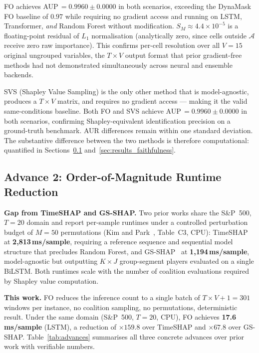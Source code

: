 \documentclass[runningheads]{llncs}
\begin{document}
FO achieves AUP\,$=0.9960\pm0.0000$ in both scenarios, exceeding the
DynaMask FO baseline of $0.97$ while requiring no gradient access and
running on LSTM, Transformer, \emph{and} Random Forest without
modification. $S_M \approx 4.4{\times}10^{-5}$ is a floating-point
residual of $L_1$ normalisation (analytically zero, since cells
outside $\mathcal{A}$ receive zero raw importance). This confirms
per-cell resolution over all $V{=}15$ original ungrouped variables,
the $T{\times}V$ output format that prior gradient-free methods had
not demonstrated simultaneously across neural and ensemble backends.

SVS (Shapley Value Sampling) is the only other method that is
model-agnostic, produces a $T{\times}V$ matrix, and requires no
gradient access --- making it the valid same-conditions baseline.
Both FO and SVS achieve AUP\,$=0.9960\pm0.0000$ in both scenarios,
confirming Shapley-equivalent identification precision on a
ground-truth benchmark. AUR differences remain within one standard
deviation. The substantive difference between the two methods is
therefore computational: quantified in Sections~\ref{sec:advance2}
and~\ref{sec:results_faithfulness}.

\subsection{Advance 2: Order-of-Magnitude Runtime Reduction}
\label{sec:advance2}

\textbf{Gap from TimeSHAP and GS-SHAP.}
Two prior works share the S\&P~500, $T{=}20$ domain and report
per-sample runtimes under a controlled perturbation budget of
$M{=}50$ permutations (Kim and Park~\cite{gsshap2026}, Table~C3,
CPU): TimeSHAP~\cite{bento2021} at \textbf{2,813\,ms/sample},
requiring a reference sequence and sequential model structure that
precludes Random Forest, and GS-SHAP~\cite{gsshap2026} at
\textbf{1,194\,ms/sample}, model-agnostic but outputting $K{\times}J$
group-segment players evaluated on a single BiLSTM. Both runtimes
scale with the number of coalition evaluations required by Shapley
value computation.

\textbf{This work.}
FO reduces the inference count to a single batch of
$T{\times}V{+}1{=}301$ windows per instance, no coalition sampling,
no permutations, deterministic result.
Under the same domain (S\&P~500, $T{=}20$, CPU), FO achieves
\textbf{17.6\,ms/sample} (LSTM), a reduction of ${\times}159.8$
over TimeSHAP and ${\times}67.8$ over GS-SHAP.
Table~\ref{tab:advances} summarises all three concrete advances over
prior work with verifiable numbers.
\end{document}
